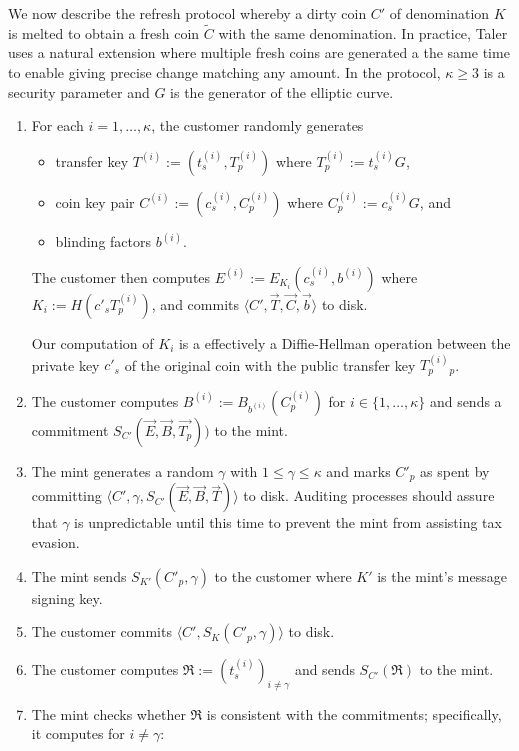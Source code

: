 \documentclass{llncs}
\begin{document}
We now describe the refresh protocol whereby a dirty coin $C'$ of 
denomination $K$ is melted to obtain a fresh coin $\widetilde{C}$
with the same denomination.  In practice, Taler uses a natural
extension where multiple fresh coins are generated a the same time to
enable giving precise change matching any amount.  
In the protocol, $\kappa \ge 3$ is a security parameter and $G$ is the
generator of the elliptic curve.

\begin{enumerate}
  \item For each $i = 1,\ldots,\kappa$, the customer randomly generates
    \begin{itemize}
      \item transfer key $T^{(i)} := \left(t^{(i)}_s,T^{(i)}_p\right)$
            where $T^{(i)}_p := t^{(i)}_s G$,
      \item coin key pair $C^{(i)} := \left(c_s^{(i)}, C_p^{(i)}\right)$
            where $C^{(i)}_p := c^{(i)}_s G$, and
      \item blinding factors $b^{(i)}$.
    \end{itemize}
    The customer then computes
      $E^{(i)} := E_{K_i}\left(c_s^{(i)}, b^{(i)}\right)$
    where $K_i := H(c'_s T_p^{(i)})$, and
    commits $\langle C', \vec{T}, \vec{C}, \vec{b} \rangle$ to disk.

    Our computation of $K_i$ is a effectively a Diffie-Hellman operation
    between the private key $c'_s$ of the original coin with
    the public transfer key $T_p^{(i)}_p$.
  \item The customer computes $B^{(i)} := B_{b^{(i)}}(C^{(i)}_p)$  for $i \in \{1,\ldots,\kappa\}$ and sends a commitment
    $S_{C'}(\vec{E}, \vec{B}, \vec{T_p}))$ to the mint.
  \item The mint generates a random $\gamma$ with $1 \le \gamma \le \kappa$ and
    marks $C'_p$ as spent by committing
    $\langle C', \gamma, S_{C'}(\vec{E}, \vec{B}, \vec{T}) \rangle$ to disk.
    Auditing processes should assure that $\gamma$ is unpredictable until
    this time to prevent the mint from assisting tax evasion.
  \item The mint sends $S_{K'}(C'_p, \gamma)$ to the customer where
    $K'$ is the mint's message signing key. 
  \item The customer commits $\langle C', S_K(C'_p, \gamma) \rangle$ to disk.
  \item The customer computes $\mathfrak{R} := \left(t_s^{(i)}\right)_{i \ne \gamma}$
        and sends $S_{C'}(\mathfrak{R})$ to the mint.
  \item \label{step:refresh-ccheck} The mint checks whether $\mathfrak{R}$ is consistent with the commitments;
    specifically, it computes for $i \not= \gamma$:


\end{enumerate}
\end{document}
